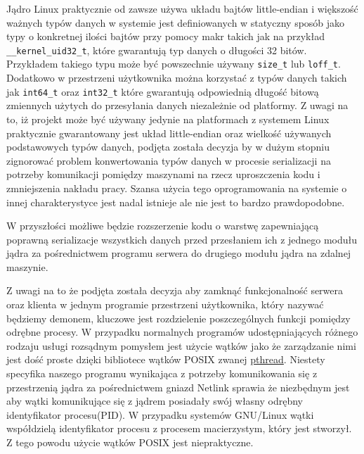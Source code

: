 Jądro Linux praktycznie od zawsze używa układu bajtów little-endian i
większość ważnych typów danych w systemie jest definiowanych w statyczny
sposób jako typy o konkretnej ilości bajtów przy pomocy makr takich jak
na przykład \texttt{\_\_kernel\_uid32\_t}, które gwarantują typ danych o
długości 32 bitów. Przykładem takiego typu może być powszechnie używany
\texttt{size\_t} lub \texttt{loff\_t}. Dodatkowo w przestrzeni
użytkownika można korzystać z typów danych takich jak \texttt{int64\_t}
oraz \texttt{int32\_t} które gwarantują odpowiednią długość bitową
zmiennych użytych do przesyłania danych niezależnie od platformy. Z
uwagi na to, iż projekt może być używany jedynie na platformach z
systemem Linux praktycznie gwarantowany jest układ little-endian oraz
wielkość używanych podstawowych typów danych, podjęta została decyzja by
w dużym stopniu zignorować problem konwertowania typów danych w procesie
serializacji na potrzeby komunikacji pomiędzy maszynami na rzecz
uproszczenia kodu i zmniejszenia nakładu pracy. Szansa użycia tego
oprogramowania na systemie o innej charakterystyce jest nadal istnieje
ale nie jest to bardzo prawdopodobne.

W przyszłości możliwe będzie rozszerzenie kodu o warstwę zapewniającą
poprawną serializacje wszystkich danych przed przesłaniem ich z jednego
modułu jądra za pośrednictwem programu serwera do drugiego modułu jądra
na zdalnej maszynie.


Z uwagi na to że podjęta została decyzja aby zamknąć funkcjonalność
serwera oraz klienta w jednym programie przestrzeni użytkownika, który
nazywać będziemy demonem, kluczowe jest rozdzielenie poszczególnych
funkcji pomiędzy odrębne procesy. W przypadku normalnych programów
udostępniających różnego rodzaju usługi rozsądnym pomysłem jest użycie
wątków jako że zarządzanie nimi jest dość proste dzięki bibliotece
wątków POSIX zwanej
\href{https://computing.llnl.gov/tutorials/pthreads/}{pthread}. Niestety
specyfika naszego programu wynikająca z potrzeby komunikowania się z
przestrzenią jądra za pośrednictwem gniazd Netlink sprawia że niezbędnym
jest aby wątki komunikujące się z jądrem posiadały swój własny odrębny
identyfikator procesu(PID). W przypadku systemów GNU/Linux wątki
współdzielą identyfikator procesu z procesem macierzystym, który jest
stworzył. Z tego powodu użycie wątków POSIX jest niepraktyczne.

